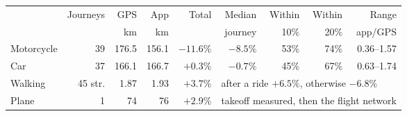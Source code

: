 \begin{tabular}{lrrrrrrrr}
\toprule
 & Journeys & GPS & App & Total & Median & Within & Within & Range\\
 & & km & km & & journey & 10\% & 20\% & app/GPS\\
\midrule
Motorcycle & 39 & 176.5 & 156.1 & $-11.6\%$ & $-8.5\%$ & 53\% & 74\% & 0.36--1.57 \\
Car & 37 & 166.1 & 166.7 & $+0.3\%$ & $-0.7\%$ & 45\% & 67\% & 0.63--1.74 \\
Walking & 45 str. & 1.87 & 1.93 & $+3.7\%$ & \multicolumn{4}{l}{after a ride $+6.5\%$, otherwise $-6.8\%$} \\
Plane & 1 & 74 & 76 & $+2.9\%$ & \multicolumn{4}{l}{takeoff measured, then the flight network} \\
\bottomrule
\end{tabular}
